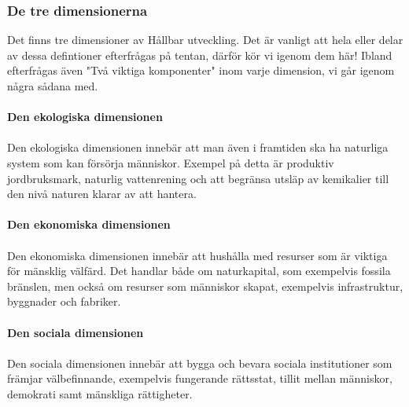 \documentclass{article}
\begin{document}
\subsubsection{De tre dimensionerna}
Det finns tre dimensioner av Hållbar utveckling. Det är vanligt att hela eller delar av dessa defintioner efterfrågas på tentan, därför kör vi igenom dem här! Ibland efterfrågas även "Två viktiga komponenter" inom varje dimension, vi går igenom några sådana med.\\
\\
\textbf{Den ekologiska dimensionen}\\
\ \\
Den ekologiska dimensionen innebär att man även i framtiden ska ha naturliga system som kan försörja människor. Exempel på detta är produktiv jordbruksmark, naturlig vattenrening och att begränsa utsläp av kemikalier till den nivå naturen klarar av att hantera.\\
\\
\textbf{Den ekonomiska dimensionen}\\
\ \\
Den ekonomiska dimensionen innebär att hushålla med resurser som är viktiga för mänsklig välfärd. Det handlar både om naturkapital, som exempelvis fossila bränslen, men också om resurser som människor skapat, exempelvis infrastruktur, byggnader och fabriker.\\
\\
\textbf{Den sociala dimensionen}\\
\ \\
Den sociala dimensionen innebär att bygga och bevara sociala institutioner som främjar välbefinnande, exempelvis fungerande rättsstat, tillit mellan människor, demokrati samt mänskliga rättigheter.
\end{document}
